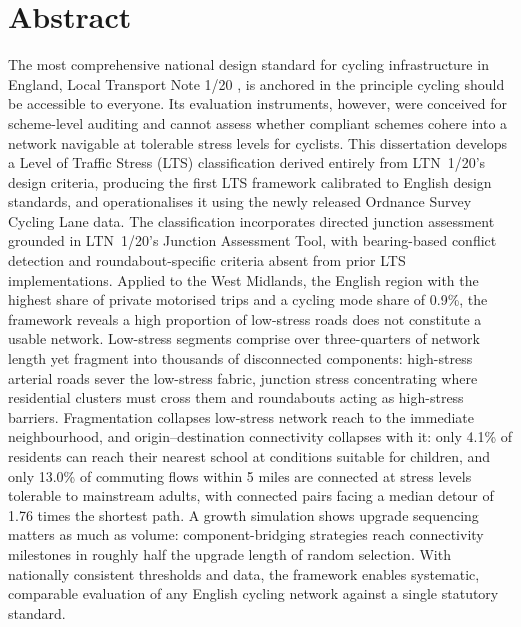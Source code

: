 
\chapter*{Abstract}
The most comprehensive national design standard for cycling infrastructure in England, Local Transport Note 1/20 \parencite{departmentfortransport2020a}, is anchored in the principle cycling should be accessible to everyone. Its evaluation instruments, however, were conceived for scheme-level auditing and cannot assess whether compliant schemes cohere into a network navigable at tolerable stress levels for cyclists. This dissertation develops a Level of Traffic Stress (LTS) classification derived entirely from LTN~1/20's design criteria, producing the first LTS framework calibrated to English design standards, and operationalises it using the newly released Ordnance Survey Cycling Lane data. The classification incorporates directed junction assessment grounded in LTN~1/20's Junction Assessment Tool, with bearing-based conflict detection and roundabout-specific criteria absent from prior LTS implementations. Applied to the West Midlands, the English region with the highest share of private motorised trips and a cycling mode share of 0.9\%, the framework reveals a high proportion of low-stress roads does not constitute a usable network. Low-stress segments comprise over three-quarters of network length yet fragment into thousands of disconnected components: high-stress arterial roads sever the low-stress fabric, junction stress concentrating where residential clusters must cross them and roundabouts acting as high-stress barriers. Fragmentation collapses low-stress network reach to the immediate neighbourhood, and origin--destination connectivity collapses with it: only 4.1\% of residents can reach their nearest school at conditions suitable for children, and only 13.0\% of commuting flows within 5 miles are connected at stress levels tolerable to mainstream adults, with connected pairs facing a median detour of 1.76 times the shortest path. A growth simulation shows upgrade sequencing matters as much as volume: component-bridging strategies reach connectivity milestones in roughly half the upgrade length of random selection. With nationally consistent thresholds and data, the framework enables systematic, comparable evaluation of any English cycling network against a single statutory standard.

\newpage
